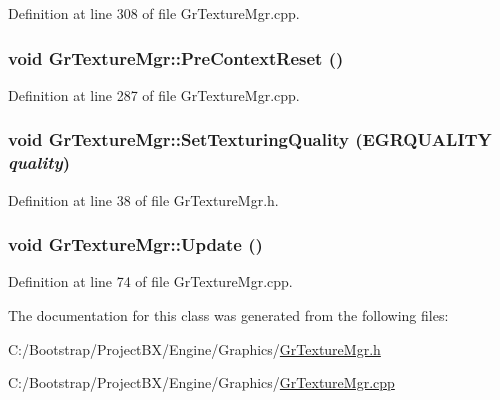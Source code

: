 Definition at line 308 of file GrTextureMgr.cpp.\hypertarget{class_gr_texture_mgr_c03dca06b6577638a465efba18b89502}{
\subsubsection[{PreContextReset}]{\setlength{\rightskip}{0pt plus 5cm}void GrTextureMgr::PreContextReset ()}}
\label{class_gr_texture_mgr_c03dca06b6577638a465efba18b89502}




Definition at line 287 of file GrTextureMgr.cpp.\hypertarget{class_gr_texture_mgr_de4ad2113d60ada7c4e178b0e752a45d}{
\subsubsection[{SetTexturingQuality}]{\setlength{\rightskip}{0pt plus 5cm}void GrTextureMgr::SetTexturingQuality ({\bf EGRQUALITY} {\em quality})}}
\label{class_gr_texture_mgr_de4ad2113d60ada7c4e178b0e752a45d}




Definition at line 38 of file GrTextureMgr.h.\hypertarget{class_gr_texture_mgr_791f429e9ba38f366812e5258e27ed2d}{
\subsubsection[{Update}]{\setlength{\rightskip}{0pt plus 5cm}void GrTextureMgr::Update ()}}
\label{class_gr_texture_mgr_791f429e9ba38f366812e5258e27ed2d}




Definition at line 74 of file GrTextureMgr.cpp.

The documentation for this class was generated from the following files:\begin{CompactItemize}
\item 
C:/Bootstrap/ProjectBX/Engine/Graphics/\hyperlink{_gr_texture_mgr_8h}{GrTextureMgr.h}\item 
C:/Bootstrap/ProjectBX/Engine/Graphics/\hyperlink{_gr_texture_mgr_8cpp}{GrTextureMgr.cpp}\end{CompactItemize}

